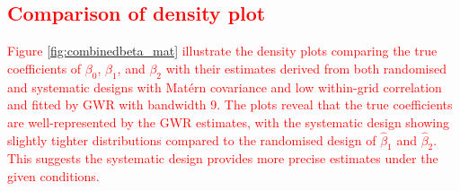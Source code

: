 \documentclass[a4paper]{article} 	%
\newcommand{\Matern}{Mat\'ern }
\newcommand{\zc}[1]{\textcolor{red}{#1}}
\begin{document}
\subsection{\zc{Comparison of density plot}}

\zc{Figure \ref{fig:combinedbeta_mat} illustrate the density plots comparing the true coefficients of $\beta_0$, $\beta_1$, and $\beta_2$ with their estimates derived from both randomised and systematic designs with \Matern covariance and low within-grid correlation and fitted by GWR with bandwidth 9. The plots reveal that the true coefficients are well-represented by the GWR estimates, with the systematic design showing slightly tighter distributions compared to the randomised design of $\hat{\beta}_1$ and $\hat{\beta}_2$. This suggests the systematic design provides more precise estimates under the given conditions.}
\end{document}
